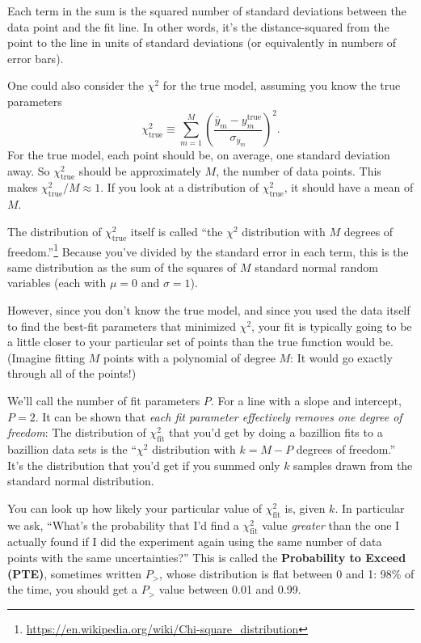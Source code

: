 \documentclass[12pt]{article}
\begin{document}
Each term in the sum is the squared number of standard deviations between the data point and the fit line. In other words, it's the distance-squared from the point to the line in units of standard deviations (or equivalently in numbers of error bars).

One could also consider the $\chi^2$ for the true model, assuming you know the true parameters
\[
\chi_\textrm{true}^2 \equiv 
\sum_{m=1}^{M} \left( \frac{\bar y_m - y^\textrm{true}_m}{\sigma_{\bar y_m}} \right)^2 .
\]
For the true model, each point should be, on average, one standard deviation away. So $\chi_\textrm{true}^2$ should be approximately $M$, the number of data points. This makes $\chi_\textrm{true}^2 / M \approx 1$. If you look at a distribution of $\chi_\textrm{true}^2$, it should have a mean of $M$.

The distribution of $\chi_\textrm{true}^2$ itself is called ``the $\chi^2$ distribution with $M$ degrees of freedom.''\footnote{\url{https://en.wikipedia.org/wiki/Chi-square_distribution}} Because you've divided by the standard error in each term, this is the same distribution as the sum of the squares of $M$ standard normal random variables (each with $\mu=0$ and $\sigma=1$).

However, since you don't know the true model, and since you used the data itself to find the best-fit parameters that minimized $\chi^2$, your fit is typically going to be a little closer to your particular set of points than the true function would be. (Imagine fitting $M$ points with a polynomial of degree $M$: It would go exactly through all of the points!)

We'll call the number of fit parameters $P$. For a line with a slope and intercept, $P=2$. It can be shown that \textit{each fit parameter effectively removes one degree of freedom}: The distribution of $\chi_\textrm{fit}^2$ that you'd get by doing a bazillion fits to a bazillion data sets is the ``$\chi^2$ distribution with $k=M-P$ degrees of freedom.'' It's the distribution that you'd get if you summed only $k$ samples drawn from the standard normal distribution.


You can look up how likely your particular value of $\chi_\textrm{fit}^2$ is, given $k$. In particular we ask, ``What's the probability that I'd find a $\chi_\textrm{fit}^2$ value \textit{greater} than the one I actually found if I did the experiment again using the same number of data points with the same uncertainties?'' This is called the \textbf{Probability to Exceed (PTE)}, sometimes written $P_>$, whose distribution is flat between 0 and 1: 98\% of the time, you should get a $P_>$ value between 0.01 and 0.99.
\end{document}
